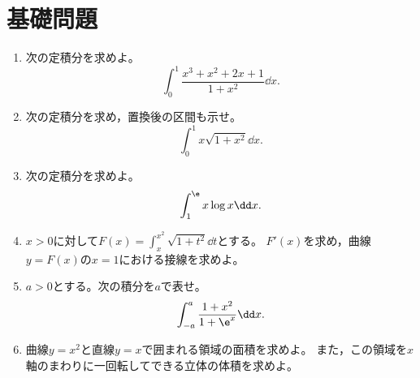 \section{基礎問題}\label{節:総合基礎}

\begin{enumerate}[label=\textbf{\thechapter.\arabic*},leftmargin=*]
 \item\label{問:総合一割り算}
 次の定積分を求めよ。
 \[
  \int_0^1\frac{x^3+x^2+2x+1}{1+x^2}\dd x.
 \]
 \item\label{問:総合二置換}
 次の定積分を求め，置換後の区間も示せ。
 \[
  \int_0^1x\sqrt{1+x^2}\dd x.
 \]
 \item\label{問:総合三部分積分}
 次の定積分を求めよ。
 \[
  \int_1^{\e}x\log x\dd x.
 \]
 \item\label{問:総合四動く端点}
 $x>0$に対して$F(x)=\int_x^{x^2}\sqrt{1+t^2}\dd t$とする。
 $F'(x)$を求め，曲線$y=F(x)$の$x=1$における接線を求めよ。
 \item\label{問:総合五相補重み}
 $a>0$とする。次の積分を$a$で表せ。
 \[
  \int_{-a}^{a}\frac{1+x^2}{1+\e^x}\dd x.
 \]
 \item\label{問:総合六面積体積}
 曲線$y=x^2$と直線$y=x$で囲まれる領域の面積を求めよ。
 また，この領域を$x$軸のまわりに一回転してできる立体の体積を求めよ。
\end{enumerate}


